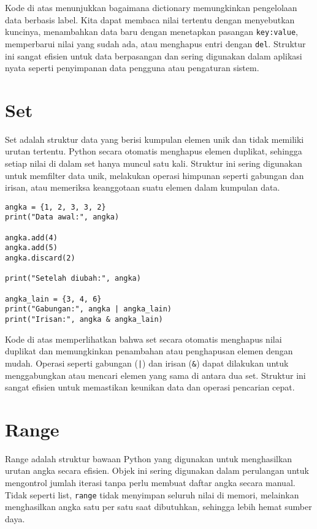 Kode di atas menunjukkan bagaimana dictionary memungkinkan pengelolaan data berbasis label. 
Kita dapat membaca nilai tertentu dengan menyebutkan kuncinya, 
menambahkan data baru dengan menetapkan pasangan \texttt{key:value}, 
memperbarui nilai yang sudah ada, atau menghapus entri dengan \texttt{del}. 
Struktur ini sangat efisien untuk data berpasangan dan sering digunakan dalam aplikasi nyata seperti penyimpanan data pengguna atau pengaturan sistem.

\section{Set}
Set adalah struktur data yang berisi kumpulan elemen unik dan tidak memiliki urutan tertentu. 
Python secara otomatis menghapus elemen duplikat, sehingga setiap nilai di dalam set hanya muncul satu kali. 
Struktur ini sering digunakan untuk memfilter data unik, melakukan operasi himpunan seperti gabungan dan irisan, 
atau memeriksa keanggotaan suatu elemen dalam kumpulan data.

\begin{lstlisting}[style=PythonStyle]
angka = {1, 2, 3, 3, 2}
print("Data awal:", angka)

angka.add(4)
angka.add(5)
angka.discard(2)

print("Setelah diubah:", angka)

angka_lain = {3, 4, 6}
print("Gabungan:", angka | angka_lain)
print("Irisan:", angka & angka_lain)
\end{lstlisting}

Kode di atas memperlihatkan bahwa set secara otomatis menghapus nilai duplikat 
dan memungkinkan penambahan atau penghapusan elemen dengan mudah. 
Operasi seperti gabungan (\texttt{|}) dan irisan (\texttt{\&}) dapat dilakukan untuk menggabungkan atau mencari elemen yang sama di antara dua set. 
Struktur ini sangat efisien untuk memastikan keunikan data dan operasi pencarian cepat.


\section{Range}
Range adalah struktur bawaan Python yang digunakan untuk menghasilkan urutan angka secara efisien. 
Objek ini sering digunakan dalam perulangan untuk mengontrol jumlah iterasi tanpa perlu membuat daftar angka secara manual. 
Tidak seperti list, \texttt{range} tidak menyimpan seluruh nilai di memori, melainkan menghasilkan angka satu per satu saat dibutuhkan, sehingga lebih hemat sumber daya.

